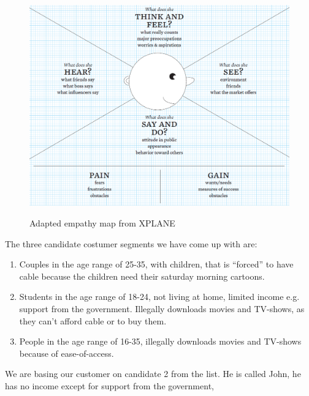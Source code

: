 \begin{figure}[h]
    \begin{center}
        \includegraphics[scale=0.52]{./pics/empathy_map}
        \label{fig:empathy_map}
        \caption{Adapted empathy map from XPLANE\cite{3}}
    \end{center}
\end{figure}

The three candidate costumer segments we have come up with are:
\begin{enumerate}
\item Couples in the age range of 25-35, with children, that is ``forced'' to have cable because the children need their saturday morning cartoons.
\item Students in the age range of 18-24, not living at home, limited income e.g. support from the government. Illegally downloads movies and TV-shows, as they can't afford cable or to buy them.
\item People in the age range of 16-35, illegally downloads movies and TV-shows because of ease-of-access.
\end{enumerate}

We are basing our customer on candidate 2 from the list. He is called John, he has no income except for support from the government,

